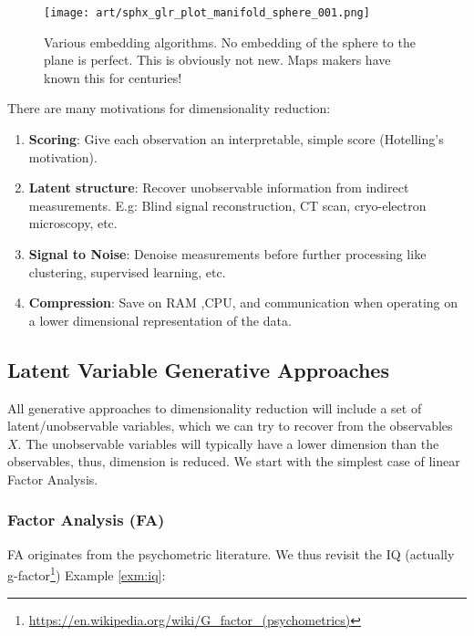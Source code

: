 \documentclass[]{book}
\theoremstyle{definition}
\theoremstyle{definition}
\theoremstyle{definition}
\theoremstyle{remark}
\begin{document}
\begin{figure}
\centering
\texttt{[image: art/sphx\_glr\_plot\_manifold\_sphere\_001.png]}
\caption{Various embedding algorithms. No embedding of the sphere to the plane is perfect. This is obviously not new. Maps makers have known this for centuries!}
\end{figure}

There are many motivations for dimensionality reduction:

\begin{enumerate}
\def\labelenumi{\arabic{enumi}.}
\item
  \textbf{Scoring}:
  Give each observation an interpretable, simple score (Hotelling's motivation).
\item
  \textbf{Latent structure}:
  Recover unobservable information from indirect measurements.
  E.g: Blind signal reconstruction, CT scan, cryo-electron microscopy, etc.
\item
  \textbf{Signal to Noise}:
  Denoise measurements before further processing like clustering, supervised learning, etc.
\item
  \textbf{Compression}:
  Save on RAM ,CPU, and communication when operating on a lower dimensional representation of the data.
\end{enumerate}

\hypertarget{latent-variable-generative-approaches}{%
\subsection{Latent Variable Generative Approaches}\label{latent-variable-generative-approaches}}

All generative approaches to dimensionality reduction will include a set of latent/unobservable variables, which we can try to recover from the observables \(X\).
The unobservable variables will typically have a lower dimension than the observables, thus, dimension is reduced.
We start with the simplest case of linear Factor Analysis.

\hypertarget{factor-analysis}{%
\subsubsection{Factor Analysis (FA)}\label{factor-analysis}}

FA originates from the psychometric literature.
We thus revisit the IQ (actually g-factor\footnote{\url{https://en.wikipedia.org/wiki/G_factor_(psychometrics)}}) Example \ref{exm:iq}:
\end{document}
